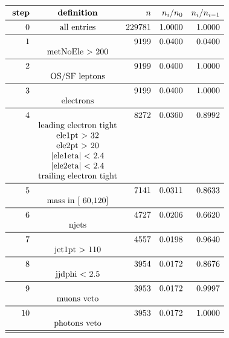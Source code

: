 \documentclass[11pt,a4paper]{article}
\begin{document}
\begin{table}
\caption{\emph{Entries after each selection step, normalised to 5.00 $fb^{-1}$; n is the number of entries after the i-th selection step; Note that cuts on second jet are applied only if a second jet exists with $p_t$ > 30\,GeV.}}
\[
\begin{array}{rcrrr}
\toprule
\ \textbf{step}& \textbf{definition}  & n  &  n_i/n_0 & n_i/n_{i-1}  \\ 
\midrule
 0  & \text{all entries} & 229781 & 1.0000 & 1.0000 \\
\midrule
 1  & &   9199 & 0.0400 & 0.0400 \\
& \text{metNoEle > 200} & & & \\
\midrule
 2  & &   9199 & 0.0400 & 1.0000 \\
& \text{OS/SF leptons} & & & \\
\midrule
 3  & &   9199 & 0.0400 & 1.0000 \\
& \text{electrons} & & & \\
\midrule
 4  & &   8272 & 0.0360 & 0.8992 \\
& \text{leading electron tight} & & & \\
& \text{ele1pt >  32} & & & \\
& \text{ele2pt >  20} & & & \\
& \text{|ele1eta| < 2.4} & & & \\
& \text{|ele2eta| < 2.4} & & & \\
& \text{trailing electron tight} & & & \\
\midrule
 5  & &   7141 & 0.0311 & 0.8633 \\
& \text{mass in [ 60,120]} & & & \\
\midrule
 6  & &   4727 & 0.0206 & 0.6620 \\
& \text{njets} & & & \\
\midrule
 7  & &   4557 & 0.0198 & 0.9640 \\
& \text{jet1pt >  110} & & & \\
\midrule
 8  & &   3954 & 0.0172 & 0.8676 \\
& \text{jjdphi < 2.5} & & & \\
\midrule
 9  & &   3953 & 0.0172 & 0.9997 \\
& \text{muons veto} & & & \\
\midrule
 10  & &   3953 & 0.0172 & 1.0000 \\
& \text{photons veto} & & & \\
\midrule
\bottomrule
\end{array}
\]
\end{table}
\end{document}
